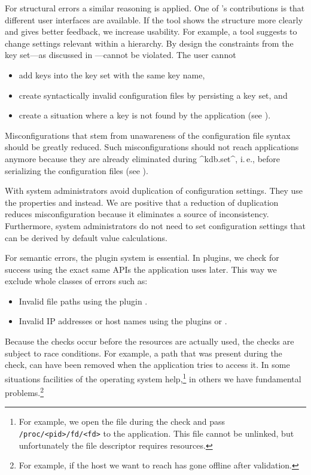\begin{code}[language=Cpp,firstnumber=19]
For structural errors a similar reasoning is applied.
One of \elektra{}'s contributions is that different user interfaces are available.
If the tool shows the structure more clearly and gives better feedback, we increase usability.
For example, a tool suggests to change settings relevant within a hierarchy.
By design the constraints from the key set---as discussed in ---cannot be violated.
The user cannot
\begin{itemize}
\item add keys into the key set with the same key name,
\item create syntactically invalid configuration files by persisting a key set, and
\item create a situation where a key is not found by the application (see ).
\end{itemize}
Misconfigurations that stem from unawareness of the configuration file syntax should be greatly reduced.
Such misconfigurations should not reach applications anymore because they are already eliminated during ^kdb.set^, i.\,e., before serializing the configuration files (see ).

With  system administrators avoid duplication of configuration settings.
They use the properties  and  instead.
We are positive that a reduction of duplication reduces misconfiguration because it eliminates a source of inconsistency.
Furthermore, system administrators do not need to set configuration settings that can be derived by default value calculations.

For semantic errors, the plugin system is essential.
In plugins, we check for success using the exact same APIs the application uses later.
This way we exclude whole classes of errors such as:
\begin{itemize}
\item Invalid file paths using the plugin .
\item Invalid IP addresses or host names using the plugins  or .
\end{itemize}
Because the checks occur before the resources are actually used, the checks are subject to race conditions.
For example, a path that was present during the check, can have been removed when the application tries to access it.
In some situations facilities of the operating system help,\footnote{For example, we open the file during the check and pass \texttt{/proc/<pid>/fd/<fd>} to the application. This file cannot be unlinked, but unfortunately the file descriptor requires resources.} in others we have fundamental problems.\footnote{For example, if the host we want to reach has gone offline after validation.}


\end{code}
